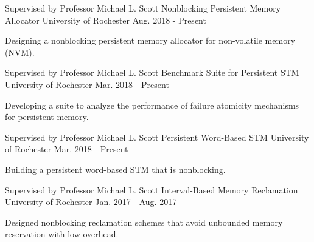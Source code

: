 

\begin{cventries}

  \cventry
    {Supervised by Professor Michael L. Scott} %
    {Nonblocking Persistent Memory Allocator} %
    {University of Rochester} %
    {Aug. 2018 - Present} %
    {
      \begin{cvitems} %
        \item {Designing a nonblocking persistent memory allocator for non-volatile memory (NVM).}
      \end{cvitems}
	}

  \cventry
    {Supervised by Professor Michael L. Scott} %
    {Benchmark Suite for Persistent STM} %
    {University of Rochester} %
    {Mar. 2018 - Present} %
    {
      \begin{cvitems} %
        \item {Developing a suite to analyze the performance of failure atomicity mechanisms for persistent memory.}
      \end{cvitems}
    }

  \cventry
    {Supervised by Professor Michael L. Scott} %
    {Persistent Word-Based STM} %
    {University of Rochester} %
    {Mar. 2018 - Present} %
    {
      \begin{cvitems} %
        \item {Building a persistent word-based STM that is nonblocking.}
      \end{cvitems}
    }

  \cventry
    {Supervised by Professor Michael L. Scott} %
    {Interval-Based Memory Reclamation} %
    {University of Rochester} %
    {Jan. 2017 - Aug. 2017} %
    {
      \begin{cvitems} %
        \item {Designed nonblocking reclamation schemes that avoid unbounded memory reservation with low overhead.}
      \end{cvitems}
    }


\end{cventries}

